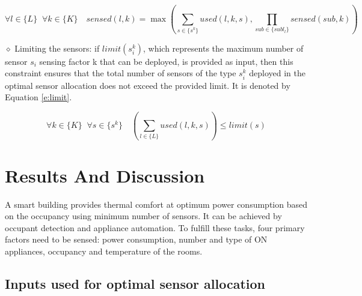 \documentclass[]{interact}
\theoremstyle{plain}%
\theoremstyle{definition}
\theoremstyle{remark}
\begin{document}
  \begin{equation}
    \label{e:sub_loc}
    \forall l \in \{L\} \;\; \forall k \in \{K\} \quad sensed(l,k) = \max \left(
  \sum_{s \in \{s^k\}}  used(l,k,s) , 
  \prod_{sub \in \{subl_l\}} sensed(sub,k)
  \right)
  \end{equation}

  \noindent $\diamond$ Limiting the sensors: if $limit(s_i^k)$, which represents the maximum number of sensor $s_i$ sensing factor k that can be deployed, is provided as input, then this constraint ensures that the total number of sensors of the type $s_i^k$ deployed in the optimal sensor allocation does not exceed the provided limit.
  It is denoted by Equation \eqref{e:limit}.

 \begin{equation}
  \label{e:limit}
    \forall k \in \{K\} \;\; \forall s \in \{s^k\} \quad \left(
      \sum_{l \in \{L\}} used(l,k,s)
    \right) \leq limit(s)
   \end{equation}


\section{Results And Discussion}

A smart building provides thermal comfort at optimum power consumption based on the occupancy using minimum number of sensors. It can be achieved by occupant detection and appliance automation. To fulfill these tasks, four primary factors need to be sensed: power consumption, number and type of ON appliances, occupancy and temperature of the rooms.

\subsection{Inputs used for optimal sensor allocation}
\end{document}
